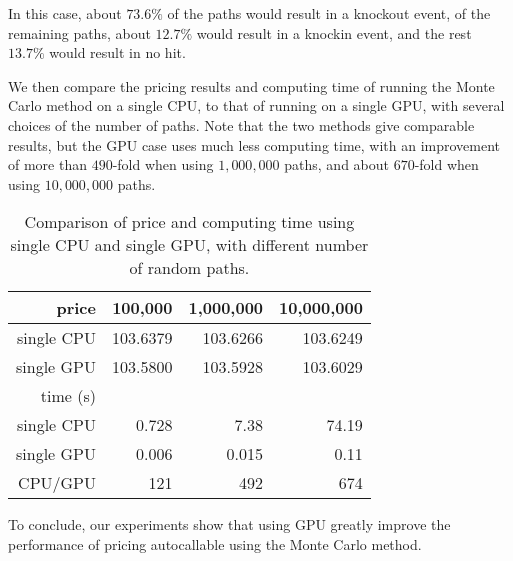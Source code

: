 In this case, about $73.6\%$ of the paths would result in a knockout event, of the remaining
paths, about $12.7\%$ would result in a knockin event, and the rest $13.7\%$ would
result in no hit.

We then compare the pricing results and computing time of running the Monte
Carlo method on a single CPU, to that of running on a single GPU, with several
choices of the number of paths. 
Note that the two methods give comparable results, but the GPU case uses much
less computing time, with an improvement of more than $490$-fold when using
$1,000,000$ paths, and about $670$-fold when using $10,000,000$ paths.

\begin{table*}
\caption{Comparison of price and computing time using single CPU and 
single GPU, with different number of random paths.}
\begin{tabular}{r|r r r}
\hline\hline
price  & 100,000 & 1,000,000 & 10,000,000 \\ 
\hline
single CPU & 103.6379 & 103.6266 & 103.6249 \\
\hline
single GPU & 103.5800 & 103.5928 & 103.6029 \\ 
\hline
time (s) &  &  &  \\ 
\hline
single CPU & 0.728 & 7.38 & 74.19 \\
\hline
single GPU & 0.006 & 0.015 & 0.11 \\ 
\hline
CPU/GPU &  121 & 492 & 674 \\
\hline
\end{tabular}
\end{table*}



\medskip

To conclude, our experiments show that using GPU greatly improve the
performance of pricing autocallable using the Monte Carlo method.

